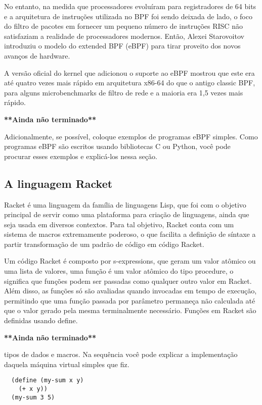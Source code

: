 \documentclass[paper=a4, fontsize=12pt]{article}
\theoremstyle{definition}
\begin{document}
No entanto, na medida que processadores evoluíram para registradores de 64 bits e a arquitetura de
instruções utilizada no BPF foi sendo deixada de lado, o foco do filtro de pacotes em fornecer um
pequeno número de instruções RISC não satisfaziam a realidade de processadores modernos. Então, Alexei
Starovoitov introduziu o modelo do extended BPF (eBPF)  para tirar proveito dos novos avanços de hardware.

A versão oficial do kernel que adicionou o suporte ao eBPF mostrou que este era até quatro vezes mais
rápido em arquitetura x86-64 do que o antigo classic BPF, para alguns microbenchmarks de filtro de rede
e a maioria era 1,5 vezes mais rápido.

\textbf{**Ainda não terminado**}

Adicionalmente, se possível, coloque
exemplos de programas eBPF simples. Como programas eBPF são escritos usando bibliotecas C
ou Python, você pode procurar esses exemplos e explicá-los nessa seção.

\subsection{A linguagem Racket}

Racket é uma linguagem da família de linguagens Lisp, que foi com o objetivo
principal de servir como uma plataforma para criação de linguagens, ainda que
seja usada em diversos contextos. Para tal objetivo, Racket conta com um
sistema de macros extremamente poderoso, o que facilita a definição de síntaxe
a partir transformação de um padrão de código em código Racket.

Um código Racket é composto por s-expressions, que geram um valor atômico 
ou uma lista de valores, uma função é um valor atômico do tipo procedure, o significa
que funções podem ser passadas como qualquer outro valor em Racket. Além disso, as funções
só são avaliadas quando invocadas em tempo de execução, permitindo que uma função
passada por parâmetro permaneça não calculada até que o valor gerado pela mesma
terminalmente necessário. Funções em Racket são definidas usando define.

\textbf{**Ainda não terminado**}

tipos de dados e macros. Na sequência você pode explicar a implementação daquela
máquina virtual simples que fiz.

\begin{lstlisting}
  (define (my-sum x y)
    (+ x y))
  (my-sum 3 5)
\end{lstlisting}
\end{document}
